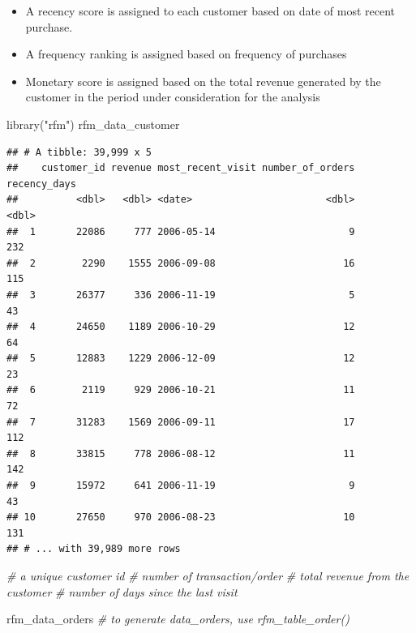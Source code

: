 \documentclass[
]{book}
\newenvironment{Shaded}{\begin{snugshade}}{\end{snugshade}}
\newcommand{\CommentTok}[1]{\textcolor[rgb]{0.56,0.35,0.01}{\textit{#1}}}
\newcommand{\FunctionTok}[1]{\textcolor[rgb]{0.00,0.00,0.00}{#1}}
\newcommand{\NormalTok}[1]{#1}
\newcommand{\StringTok}[1]{\textcolor[rgb]{0.31,0.60,0.02}{#1}}
\providecommand{\tightlist}{%
  \setlength{\itemsep}{0pt}\setlength{\parskip}{0pt}}
\begin{document}
\begin{itemize}
\tightlist
\item
  A recency score is assigned to each customer based on date of most recent purchase.
\item
  A frequency ranking is assigned based on frequency of purchases
\item
  Monetary score is assigned based on the total revenue generated by the customer in the period under consideration for the analysis
\end{itemize}

\begin{Shaded}
\begin{Highlighting}[]
\FunctionTok{library}\NormalTok{(}\StringTok{"rfm"}\NormalTok{)}
\NormalTok{rfm\_data\_customer}
\end{Highlighting}
\end{Shaded}

\begin{verbatim}
## # A tibble: 39,999 x 5
##    customer_id revenue most_recent_visit number_of_orders recency_days
##          <dbl>   <dbl> <date>                       <dbl>        <dbl>
##  1       22086     777 2006-05-14                       9          232
##  2        2290    1555 2006-09-08                      16          115
##  3       26377     336 2006-11-19                       5           43
##  4       24650    1189 2006-10-29                      12           64
##  5       12883    1229 2006-12-09                      12           23
##  6        2119     929 2006-10-21                      11           72
##  7       31283    1569 2006-09-11                      17          112
##  8       33815     778 2006-08-12                      11          142
##  9       15972     641 2006-11-19                       9           43
## 10       27650     970 2006-08-23                      10          131
## # ... with 39,989 more rows
\end{verbatim}

\begin{Shaded}
\begin{Highlighting}[]
\CommentTok{\# a unique customer id}
\CommentTok{\# number of transaction/order}
\CommentTok{\# total revenue from the customer}
\CommentTok{\# number of days since the last visit}


\NormalTok{rfm\_data\_orders }\CommentTok{\# to generate data\_orders, use rfm\_table\_order()}
\end{Highlighting}
\end{Shaded}
\end{document}
